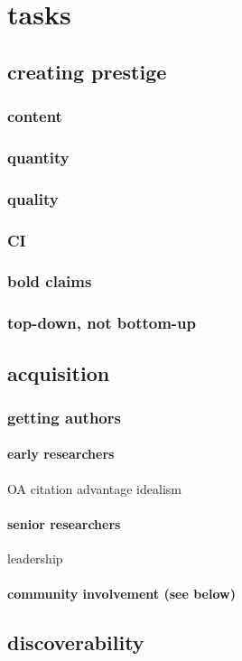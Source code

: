 \documentclass[output=guidelines,guidelines] {langscibook}
\begin{document}
\chapter{tasks}
\section{creating prestige}
\subsection{content}
\subsection{quantity}
\subsection{quality}
\subsection{CI}
\subsection{bold claims}
\subsection{top-down, not bottom-up}
\section{acquisition}
\subsection{getting authors}
\subsubsection{early researchers}
                    OA citation advantage
                    idealism
\subsubsection{senior researchers}
                    leadership
\subsubsection{community involvement (see below)}
\section{discoverability}
\end{document}
